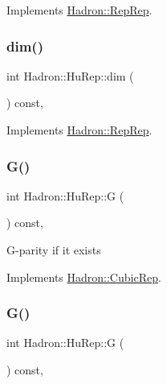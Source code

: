 Implements \mbox{\hyperlink{structHadron_1_1RepRep_a92c8802e5ed7afd7da43ccfd5b7cd92b}{Hadron\+::\+Rep\+Rep}}.

\mbox{\label{structHadron_1_1HuRep_aa222968e65bfc228eb9acf15a7df0388}} 
\subsubsection{\texorpdfstring{dim()}{dim()}\hspace{0.1cm}{\footnotesize\ttfamily [3/3]}}
{\footnotesize\ttfamily int Hadron\+::\+Hu\+Rep\+::dim (\begin{DoxyParamCaption}{ }\end{DoxyParamCaption}) const\hspace{0.3cm}{\ttfamily [inline]}, {\ttfamily [virtual]}}



Implements \mbox{\hyperlink{structHadron_1_1RepRep_a92c8802e5ed7afd7da43ccfd5b7cd92b}{Hadron\+::\+Rep\+Rep}}.

\mbox{\label{structHadron_1_1HuRep_a6486cf33fe424a2226d6fbb2dd7b7d3c}} 
\subsubsection{\texorpdfstring{G()}{G()}\hspace{0.1cm}{\footnotesize\ttfamily [1/2]}}
{\footnotesize\ttfamily int Hadron\+::\+Hu\+Rep\+::G (\begin{DoxyParamCaption}{ }\end{DoxyParamCaption}) const\hspace{0.3cm}{\ttfamily [inline]}, {\ttfamily [virtual]}}

G-\/parity if it exists 

Implements \mbox{\hyperlink{structHadron_1_1CubicRep_a52104e43266d1614c00bbd1c3b395458}{Hadron\+::\+Cubic\+Rep}}.

\mbox{\label{structHadron_1_1HuRep_a6486cf33fe424a2226d6fbb2dd7b7d3c}} 
\subsubsection{\texorpdfstring{G()}{G()}\hspace{0.1cm}{\footnotesize\ttfamily [2/2]}}
{\footnotesize\ttfamily int Hadron\+::\+Hu\+Rep\+::G (\begin{DoxyParamCaption}{ }\end{DoxyParamCaption}) const\hspace{0.3cm}{\ttfamily [inline]}, {\ttfamily [virtual]}}

